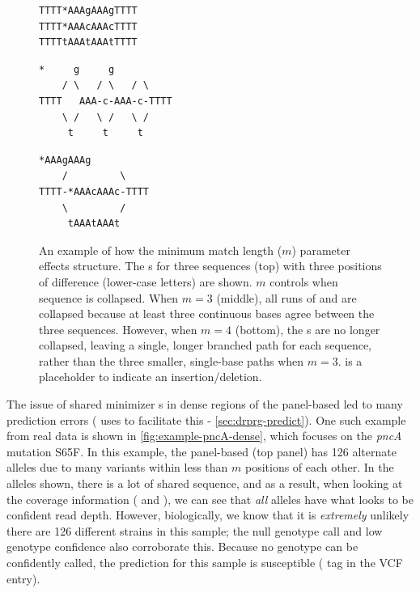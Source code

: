 \begin{figure}
\begin{Verbatim}[frame=single,framerule=0.5mm,label=Sequences,fontsize=\small,framesep=5mm]
TTTT*AAAgAAAgTTTT
TTTT*AAAcAAAcTTTT
TTTTtAAAtAAAtTTTT
\end{Verbatim}

\begin{Verbatim}[frame=single,framerule=0.5mm,label={$m=3$},fontsize=\small,framesep=5mm]
     *     g     g
    / \   / \   / \
TTTT   AAA-c-AAA-c-TTTT
    \ /   \ /   \ /
     t     t     t
\end{Verbatim}

\begin{Verbatim}[frame=single,framerule=0.5mm,label={$m=4$},fontsize=\small,framesep=5mm]
     *AAAgAAAg
    /         \
TTTT-*AAAcAAAc-TTTT
    \         /
     tAAAtAAAt
\end{Verbatim}
\caption{An example of how the \makeprg{} minimum match length ($m$) parameter effects \prg{} structure. The \prg{}s for three sequences (top) with three positions of difference (lower-case letters) are shown. $m$ controls when sequence is collapsed. When $m=3$ (middle), all runs of  and  are collapsed because at least three continuous bases agree between the three sequences. However, when $m=4$ (bottom), the s are no longer collapsed, leaving a single, longer branched path for each sequence, rather than the three smaller, single-base paths when $m=3$. \vrb{*} is a placeholder to indicate an insertion/deletion.}
\label{fig:min-match-len-example}
\end{figure}

The issue of shared minimizer \kmer{}s in dense regions of the panel-based \prg{} led to many \drprg{} prediction errors (\drprg{} uses \pandora{} to facilitate this - \autoref{sec:drprg-predict}). One such example from real data is shown in \autoref{fig:example-pncA-dense}, which focuses on the \textit{pncA} mutation S65F. In this example, the panel-based \prg{} (top panel) has 126 alternate alleles due to many variants within less than $m$ positions of each other. In the alleles shown, there is a lot of shared sequence, and as a result, when looking at the coverage information ( and ), we can see that \emph{all} alleles have what looks to be confident read depth. However, biologically, we know that it is \emph{extremely} unlikely there are 126 different strains in this sample; the null genotype call and low genotype confidence also corroborate this. Because no genotype can be confidently called, the prediction for this sample is susceptible ( tag in the VCF entry).

